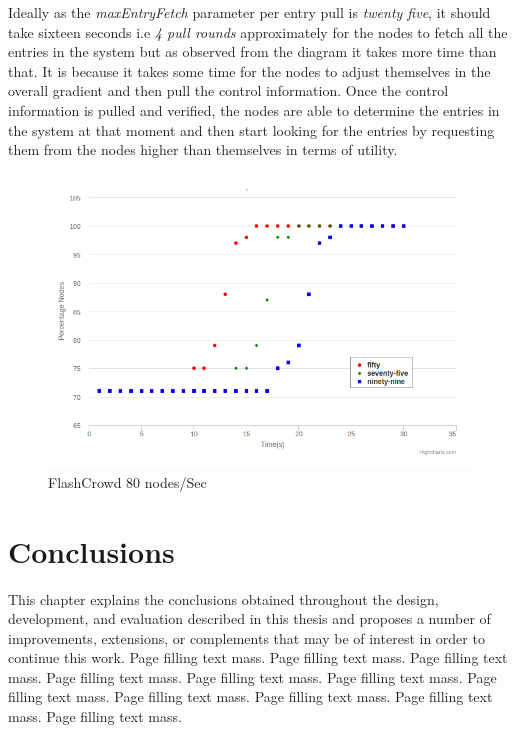 \documentclass[12pt,a4paper,twoside,openright]{book}
\begin{document}
\par Ideally as the \textit{maxEntryFetch} parameter per entry pull is \textit{twenty five}, it should take sixteen seconds i.e \textit{4 pull rounds} approximately for the nodes to fetch all the entries in the system but as observed from the diagram it takes more time than that. It is because it takes some time for the nodes to adjust themselves in the overall gradient and then pull the control information. Once the control information is pulled and verified, the nodes are able to determine the entries in the system at that moment and then start looking for the entries by requesting them from the nodes higher than themselves in terms of utility.

\begin{figure}[h]
	\includegraphics[scale=0.5]{200-80Nodes}
	\caption{FlashCrowd 80 nodes/Sec }
	\label{fig:flash80}
\end{figure}



\chapter{Conclusions}
\label{chap:conclusion}

This chapter explains the conclusions obtained throughout the design,
development, and evaluation described in this thesis and proposes a number of
improvements, extensions, or complements that may be of interest in order to
continue this work. Page filling text mass. Page filling text mass. Page
filling text mass. Page filling text mass. Page filling text mass. Page
filling text mass. Page filling text mass. Page filling text mass. Page
filling text mass. Page filling text mass. Page filling text mass.
\end{document}
